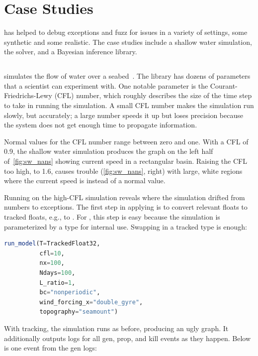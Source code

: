 \documentclass{juliacon}
\begin{document}
\section{Case Studies}
\label{s:casestudies}

\FlowFPX{} has helped to debug exceptions and fuzz for issues in a variety
of settings, some synthetic and some realistic.
The case studies include a shallow water simulation, the
\OrdinaryDiffEq{} solver, and a Bayesian inference library.

\subsection{\ShallowWaters{}}
\label{s:sw}

\ShallowWaters{} simulates the flow of water over a
seabed~\cite{klowerNumberFormatsError2020,klowerPositsAlternativeFloats2019}.
The library has dozens of parameters that a scientist can experiment with.
One notable parameter is the Courant-Friedrichs-Lewy (CFL) number, which roughly describes the size of the time step to take in running the simulation.
A small CFL number makes the simulation run slowly, but accurately; a large number speeds it up but loses precision
because the system does not get enough time to propagate information.

Normal values for the CFL number range between zero and one.
With a CFL of 0.9, the shallow water simulation produces the graph on the left half
of~\cref{fig:sw_nans} showing current speed in a rectangular basin.
Raising the CFL too high, to 1.6, causes trouble
(\cref{fig:sw_nans}, right) with large, white regions where the
current speed is \NaN{} instead of a normal value.

Running \TF{} on the high-CFL simulation reveals where the simulation drifted
from numbers to \NaN{} exceptions.
The first step in applying \TF{} is to convert relevant floats to tracked
floats, e.g.,  to .
For \ShallowWaters{}, this step is easy because the simulation is parameterized by
a \fp{} type for internal use.
Swapping in a tracked type is enough:

\begin{lstlisting}[language = Julia]
run_model(T=TrackedFloat32,
          cfl=10,
          nx=100,
          Ndays=100,
          L_ratio=1,
          bc="nonperiodic",
          wind_forcing_x="double_gyre",
          topography="seamount")
\end{lstlisting}

With tracking, the simulation runs as before, producing an ugly graph.
It additionally outputs logs for all gen, prop, and kill events
as they happen.
Below is one event from the gen logs:
\end{document}
